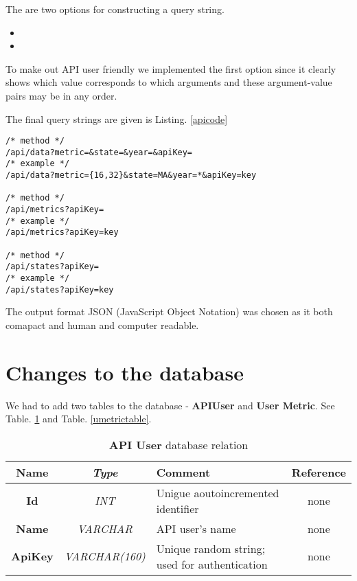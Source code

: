 			The are two options for constructing a query string.
			\begin{itemize}
				\item
				\item
			\end{itemize}
			
			To make out API user friendly we implemented the first option since it clearly shows which value corresponds to which arguments and these argument-value pairs may be in any order.
			
			The final query strings are given is Listing. \ref{apicode}
			
			\begin{lstlisting}[frame=lines, caption={API methods examples}, label=apicode, backgroundcolor=\color{codegray}, emph={data,metrics, states},emphstyle=\underbar]
/* method */
/api/data?metric=&state=&year=&apiKey=
/* example */
/api/data?metric={16,32}&state=MA&year=*&apiKey=key

/* method */
/api/metrics?apiKey=
/* example */
/api/metrics?apiKey=key

/* method */
/api/states?apiKey=
/* example */
/api/states?apiKey=key
			\end{lstlisting}
			
			The output format JSON (JavaScript Object Notation) was chosen as it both comapact and human and computer readable. 

\section{Changes to the database}

	We had to add two tables to the database - \textbf{APIUser} and \textbf{User Metric}. See Table. \ref{apiusertable} and Table. \ref{umetrictable}.
	
	\begin{table}[t!]
		\centering
		\begin{tabular}{| >{\bf}c | >{\em}c | l | c |} 
			\hline
			Name	& Type			& Comment										& Reference	\\ \hline
			Id		& INT			& Unigue aoutoincremented identifier			& none		\\
			Name	& VARCHAR		& API user's name								& none		\\
			ApiKey	& VARCHAR(160)	& Unique random string; used for authentication	& none		\\
			\hline
		\end{tabular}
		\caption{\textbf{API User} database relation}
		\label{apiusertable}
	\end{table}
	
